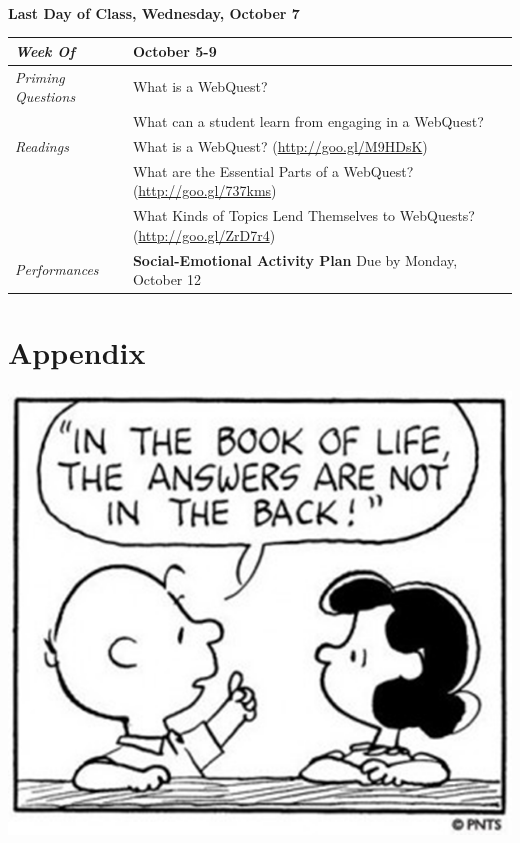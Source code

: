 \documentclass[two-side]{tufte-handout}
\newcommand{\tabpq}{\faQuestionCircle\medspace\textit{Priming Questions}}
\newcommand{\tabread}{\faBook\medspace\textit{Readings}}
\newcommand{\tabperformance}{\faTasks\medspace\textit{Performances}}
\newcommand{\tabdt}{\faCalendar\medspace\textit{Week Of}}
\newcommand{\tabbreak}{\begin{fullwidth}\begin{center}\faAsterisk\faAsterisk\faAsterisk\\\end{center}\end{fullwidth}}
\newenvironment{tabsched}
	{\small
	\begin{tabular}{p{1.5in}p{4.5in}}
	\midrule}
	{\midrule
	\end{tabular}
	\normalsize}
\newcommand{\weekeight}{October 5-9}
\newcommand{\finisemester}{\begin{fullwidth}\begin{center}\large\textbf{\faFlagCheckered Last Day of Class, Wednesday, October 7 \faFlagCheckered}\normalsize\end{center}\end{fullwidth}}
\begin{document}
\tabbreak

\newpage

\finisemester

\begin{tabsched}
	\tabdt & \weekeight \\
	\midrule
	\tabpq & What is a WebQuest? \\
	& What can a student learn from engaging in a WebQuest? \\
	\midrule
	\tabread &  What is a WebQuest? (\url{http://goo.gl/M9HDsK}) \\
	& What are the Essential Parts of a WebQuest? (\url{http://goo.gl/737kms}) \\
	& What Kinds of Topics Lend Themselves to WebQuests? (\url{http://goo.gl/ZrD7r4}) \\
	\midrule
	\tabperformance & \textbf{Social-Emotional Activity Plan} Due by Monday, October 12 \\
\end{tabsched}

\newpage

\part{Appendix}

\begin{marginfigure}%
	\begin{center}
		\includegraphics[width=1\linewidth]{ap-pic.png}
	\end{center}
\end{marginfigure}
\end{document}
